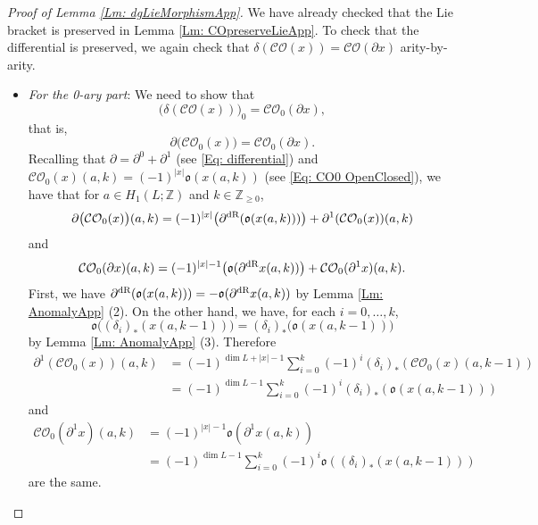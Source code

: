 \documentclass[10pt]{amsart}
\numberwithin{equation}{section}
\theoremstyle{plain}
\theoremstyle{definition}
\theoremstyle{remark}
\numberwithin{equation}{section}
\newcommand{\Z}{\mathbb{Z}}
\newcommand{\dR}{\textup{dR}}
\newcommand{\CO}{\mathcal{CO}}
\begin{document}
{\bigskip




\begin{proof}
	[Proof of Lemma \ref{Lm: dgLieMorphismApp}]
We have already checked that the Lie bracket is preserved in Lemma \ref{Lm: COpreserveLieApp}. To check that the differential is preserved, we again check that $\delta(\CO(x)) = \CO(\partial x)$ arity-by-arity.

\begin{itemize}
	\item 	\emph{For the 0-ary part}: We need to show that \[\big(\delta(\CO(x))\big)_0 = \CO_0(\partial x),\]
	that is, 
	\[
		\partial \big(\CO_0(x)\big)= \CO_0(\partial x).
	\]
	Recalling that $\partial = \partial^0+\partial^1$ (see \eqref{Eq: differential}) and $\CO_0(x)(a,k)= (-1)^{|x|}\mathfrak{o}(x(a,k))$ (see \eqref{Eq: CO0 OpenClosed}), we have that for $a\in H_1(L;\Z)$ and $k\in \Z_{\geq 0}$,
	\begin{align*}
		\partial\big(\CO_0(x)\big)(a,k) =  (-1)^{|x|}\big( \partial^\dR( \mathfrak{o}(x(a,k)))\big)+ \partial^1(\CO_0(x))(a,k) 
	\end{align*}
	and 
	\begin{align*}
		\CO_0(\partial x)(a,k) =(-1)^{|x|-1}\big(\mathfrak{o}(\partial^\dR x (a,k))\big) + \CO_0(\partial^1 x)(a,k).
	\end{align*}
	First, we have $\partial^\dR(\mathfrak{o}(x(a,k))) = - \mathfrak{o}(\partial^\dR x(a,k))$ by Lemma \ref{Lm: AnomalyApp} (2). 
	On the other hand, we have, for each $i=0,\dots, k$, \[\mathfrak{o}\big((\delta_i)_* (x(a,k-1))\big)  = (\delta_i)_* \big( \mathfrak{o}(x(a,k-1))\big)
	\]by Lemma \ref{Lm: AnomalyApp} (3). Therefore 
	\begin{align*}
		\partial^1( \CO_0(x))(a,k) &= (-1)^{\dim L + |x|-1}\sum_{i=0}^k(-1)^i (\delta_i)_*(\CO_0(x)(a,k-1))\\
		&= (-1)^{\dim L -1}\sum_{i=0}^k (-1)^i (\delta_i)_* (\mathfrak{o}(x(a,k-1)))
	\end{align*}
	and 
	\begin{align*}
		\CO_0(\partial^1 x)(a,k)&= (-1)^{|x|-1}\mathfrak{o}(\partial^1 x(a,k))\\
		 &=  (-1)^{\dim L -1}\sum_{i=0}^k (-1)^i \mathfrak{o}((\delta_i)_* (x(a,k-1)))
	\end{align*}
	are the same.
\bigskip
	


\end{itemize}
\end{proof}}
\end{document}
